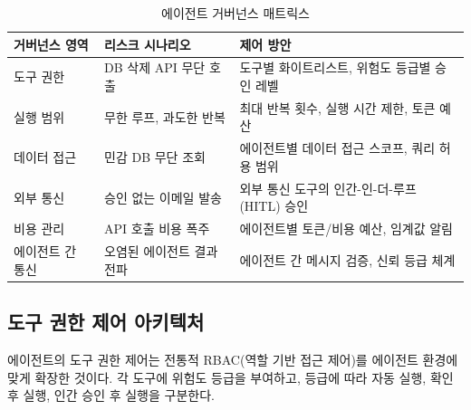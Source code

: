 \begin{table}[htbp]
\centering
\caption{에이전트 거버넌스 매트릭스}
\label{tab:agent_governance_matrix}
\begin{tabularx}{\textwidth}{p{2.5cm}p{3cm}X}
\toprule
\textbf{거버넌스 영역} & \textbf{리스크 시나리오} & \textbf{제어 방안} \\
\midrule
도구 권한 & DB 삭제 API 무단 호출 & 도구별 화이트리스트, 위험도 등급별 승인 레벨 \\
\midrule
실행 범위 & 무한 루프, 과도한 반복 & 최대 반복 횟수, 실행 시간 제한, 토큰 예산 \\
\midrule
데이터 접근 & 민감 DB 무단 조회 & 에이전트별 데이터 접근 스코프, 쿼리 허용 범위 \\
\midrule
외부 통신 & 승인 없는 이메일 발송 & 외부 통신 도구의 인간-인-더-루프(HITL) 승인 \\
\midrule
비용 관리 & API 호출 비용 폭주 & 에이전트별 토큰/비용 예산, 임계값 알림 \\
\midrule
에이전트 간 통신 & 오염된 에이전트 결과 전파 & 에이전트 간 메시지 검증, 신뢰 등급 체계 \\
\bottomrule
\end{tabularx}
\end{table}


\subsection{도구 권한 제어 아키텍처}
\label{sec:13.6.2}

에이전트의 도구 권한 제어는 전통적 RBAC(역할 기반 접근 제어)를 에이전트 환경에 맞게 확장한 것이다. 각 도구에 위험도 등급을 부여하고, 등급에 따라 자동 실행, 확인 후 실행, 인간 승인 후 실행을 구분한다.

